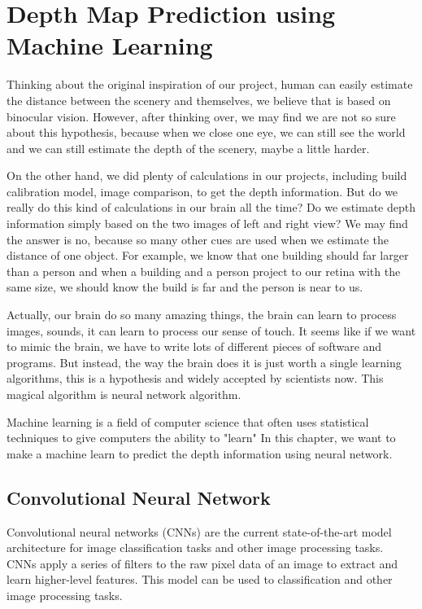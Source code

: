 \chapter{Depth Map Prediction using Machine Learning}

Thinking about the original inspiration of our project, human can easily estimate the distance between the scenery and themselves, we believe that is based on binocular vision. However, after thinking over, we may find we are not so sure about this hypothesis, because when we close one eye, we can still see the world and we can still estimate the depth of the scenery, maybe a little harder. 

On the other hand, we did plenty of calculations in our projects, including build calibration model, image comparison, to get the depth information. But do we really do this kind of calculations in our brain all the time? Do we estimate depth information simply based on the two images of left and right view? We may find the answer is no, because so many other cues are used when we estimate the distance of one object. For example, we know that one building should far larger than a person and when a building and a person project to our retina with the same size, we should know the build is far and the person is near to us. 

Actually, our brain do so many amazing things, the brain can learn to process images, sounds, it can learn to process our sense of touch. It seems like if we want to mimic the brain, we have to write lots of different pieces of software and programs. But instead, the way the brain does it is just worth a single learning algorithms, this is a hypothesis and widely accepted by scientists now. This magical algorithm is neural network algorithm. 

Machine learning is a field of computer science that often uses statistical techniques to give computers the ability to "learn" In this chapter, we want to make a machine learn to predict the depth information using neural network.

\section{Convolutional Neural Network}

Convolutional neural networks (CNNs) are the current state-of-the-art model architecture for image classification tasks and other image processing tasks. CNNs apply a series of filters to the raw pixel data of an image to extract and learn higher-level features. This model can be used  to classification and other image processing tasks.

